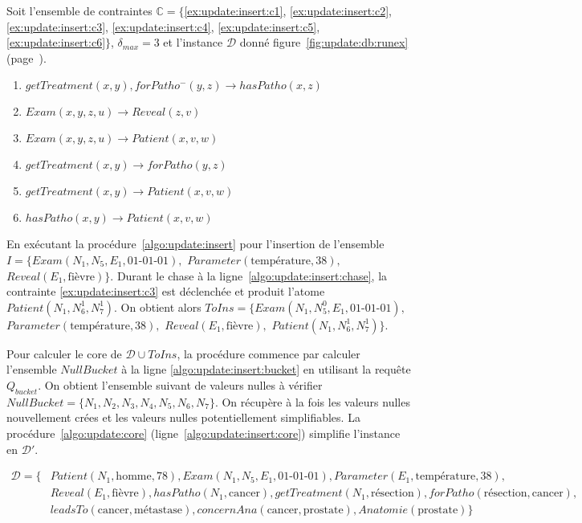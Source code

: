 \begin{example}
    Soit l'ensemble de contraintes $\mathbb{C} = \{$\ref{ex:update:insert:c1}, \ref{ex:update:insert:c2}, \ref{ex:update:insert:c3}, \ref{ex:update:insert:c4}, \ref{ex:update:insert:c5}, \ref{ex:update:insert:c6}$\}$, $\delta_{max} = 3$ et l'instance $\mathcal{D}$ donné figure~\ref{fig:update:db:runex} (page~\pageref{fig:update:db:runex}).

    \begin{enumerate}[label=\textbf{$c_\arabic*$ :},ref=$c_\arabic*$]
        \item $getTreatment(x, y), forPatho^-(y, z) \to hasPatho(x, z)$ \label{ex:update:insert:c1}
        \item $Exam(x, y, z, u) \to Reveal(z, v)$ \label{ex:update:insert:c2}
        \item $Exam(x, y, z, u) \to Patient(x, v, w)$ \label{ex:update:insert:c3}
        \item $getTreatment(x, y) \to forPatho(y, z)$ \label{ex:update:insert:c4}
        \item $getTreatment(x, y) \to Patient(x, v, w)$ \label{ex:update:insert:c5}
        \item $hasPatho(x, y) \to Patient(x, v, w)$ \label{ex:update:insert:c6}
    \end{enumerate}

    En exécutant la procédure~\ref{algo:update:insert} pour l'insertion de l'ensemble $I = \{ Exam(N_1, N_5, E_1, \text{01-01-01}),$ $Parameter(\text{température}, 38),$ $Reveal(E_1, \text{fièvre}) \}$.
    Durant le \gls{chase} à la ligne~\ref{algo:update:insert:chase}, la contrainte \ref{ex:update:insert:c3} est déclenchée et produit l'atome $Patient(N_1, N_6^1, N_7^1)$.
    On obtient alors $ToIns = \{ Exam(N_1, N_5^0, E_1, \text{01-01-01}),$ $Parameter(\text{température}, 38),$ $Reveal(E_1, \text{fièvre}),$ $Patient(N_1, N_6^1, N_7^1) \}$.

    Pour calculer le \gls{core} de $\mathcal{D} \cup ToIns$, la procédure commence par calculer l'ensemble $NullBucket$ à la ligne \ref{algo:update:insert:bucket} en utilisant la requête $Q_{bucket}$.
    On obtient l'ensemble suivant de valeurs nulles à vérifier $NullBucket = \{N_1, N_2, N_3, N_4, N_5, N_6, N_7\}$.
    On récupère à la fois les valeurs nulles nouvellement crées et les valeurs nulles potentiellement simplifiables.
    La procédure~\ref{algo:update:core} (ligne~\ref{algo:update:insert:core}) simplifie l'instance en $\mathcal{D}'$.

    \begin{align*}
        \mathcal{D} = \{ & Patient(N_1, \text{homme}, 78), Exam(N_1, N_5, E_1, \text{01-01-01}), Parameter(E_1, \text{température}, 38),                             \\
                         & Reveal(E_1, \text{fièvre}), hasPatho(N_1, \text{cancer}), getTreatment(N_1, \text{résection}), forPatho(\text{résection}, \text{cancer}), \\
                         & leadsTo(\text{cancer}, \text{métastase}), concernAna(\text{cancer}, \text{prostate}), Anatomie(\text{prostate}) \}
    \end{align*}


\end{example}
